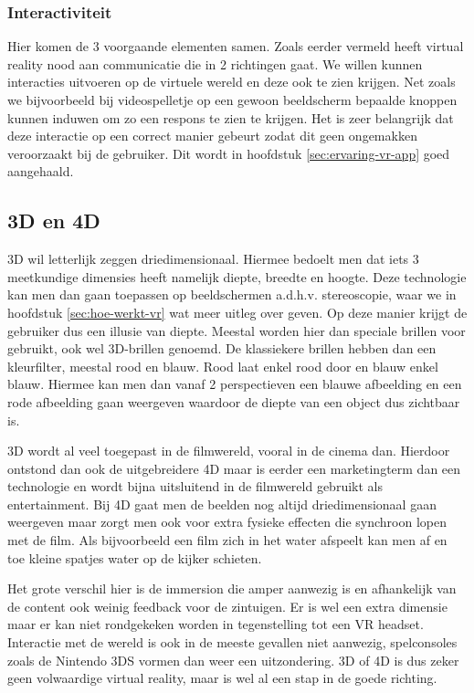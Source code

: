 \subsubsection{Interactiviteit}
\label{ssubsec:interactiviteit}
Hier komen de 3 voorgaande elementen samen. Zoals eerder vermeld heeft virtual reality nood aan communicatie die in 2 richtingen gaat. We willen kunnen interacties uitvoeren op de virtuele wereld en deze ook te zien krijgen. Net zoals we bijvoorbeeld bij videospelletje op een gewoon beeldscherm bepaalde knoppen kunnen induwen om zo een respons te zien te krijgen. Het is zeer belangrijk dat deze interactie op een correct manier gebeurt zodat dit geen ongemakken veroorzaakt bij de gebruiker. Dit wordt in hoofdstuk \ref{sec:ervaring-vr-app} goed aangehaald.

\subsection{3D en 4D}
\label{subsec:3d-4d}
3D wil letterlijk zeggen driedimensionaal. Hiermee bedoelt men dat iets 3 meetkundige dimensies heeft namelijk diepte, breedte en hoogte. Deze technologie kan men dan gaan toepassen op beeldschermen a.d.h.v. stereoscopie, waar we in hoofdstuk \ref{sec:hoe-werkt-vr} wat meer uitleg over geven. Op deze manier krijgt de gebruiker dus een illusie van diepte. Meestal worden hier dan speciale brillen voor gebruikt, ook wel 3D-brillen genoemd. De klassiekere brillen hebben dan een kleurfilter, meestal rood en blauw. Rood laat enkel rood door en blauw enkel blauw. Hiermee kan men dan vanaf 2 perspectieven een blauwe afbeelding en een rode afbeelding gaan weergeven waardoor de diepte van een object dus zichtbaar is.

3D wordt al veel toegepast in de filmwereld, vooral in de cinema dan. Hierdoor ontstond dan ook de uitgebreidere 4D maar is eerder een marketingterm dan een technologie en wordt bijna uitsluitend in de filmwereld gebruikt als entertainment. Bij 4D gaat men de beelden nog altijd driedimensionaal gaan weergeven maar zorgt men ook voor extra fysieke effecten die synchroon lopen met de film. Als bijvoorbeeld een film zich in het water afspeelt kan men af en toe kleine spatjes water op de kijker schieten.

Het grote verschil hier is de immersion die amper aanwezig is en afhankelijk van de content ook weinig feedback voor de zintuigen. Er is wel een extra dimensie maar er kan niet rondgekeken worden in tegenstelling tot een VR headset. Interactie met de wereld is ook in de meeste gevallen niet aanwezig, spelconsoles zoals de Nintendo 3DS vormen dan weer een uitzondering. 3D of 4D is dus zeker geen volwaardige virtual reality, maar is wel al een stap in de goede richting.

